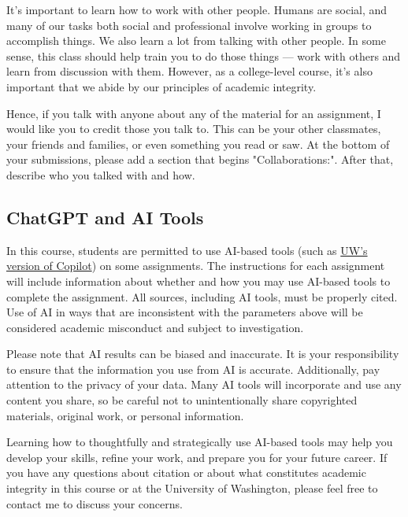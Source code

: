 \documentclass[12pt, letterpaper]{article}
\begin{document}
It's important to learn how to work with other people. Humans are social, and many of our tasks both social and professional involve working in groups to accomplish things. We also learn a lot from talking with other people. In some sense, this class should help train you to do those things — work with others and learn from discussion with them. However, as a college-level course, it's also important that we abide by our principles of academic integrity.

Hence, if you talk with anyone about any of the material for an assignment, I would like you to credit those you talk to. This can be your other classmates, your friends and families, or even something you read or saw. At the bottom of your submissions, please add a section that begins "Collaborations:". After that, describe who you talked with and how. 

\subsection*{ChatGPT and AI Tools} \label{sec:llms}

In this course, students are permitted to use AI-based tools (such as \href{https://uwconnect.uw.edu/it?id=kb_article_view&sysparm_article=KB0034403}{UW’s version of Copilot}) on some assignments. The instructions for each assignment will include information about whether and how you may use AI-based tools to complete the assignment. All sources, including AI tools, must be properly cited. Use of AI in ways that are inconsistent with the parameters above will be considered academic misconduct and subject to investigation.

Please note that AI results can be biased and inaccurate. It is your responsibility to ensure that the information you use from AI is accurate. Additionally, pay attention to the privacy of your data. Many AI tools will incorporate and use any content you share, so be careful not to unintentionally share copyrighted materials, original work, or personal information.

Learning how to thoughtfully and strategically use AI-based tools may help you develop your skills, refine your work, and prepare you for your future career. If you have any questions about citation or about what constitutes academic integrity in this course or at the University of Washington, please feel free to contact me to discuss your concerns.
\end{document}
